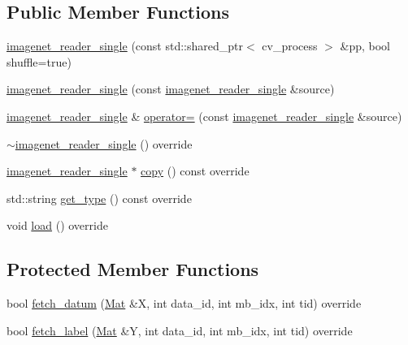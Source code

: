 \subsection*{Public Member Functions}
\begin{DoxyCompactItemize}
\item 
\hyperlink{classlbann_1_1imagenet__reader__single_ac42ce78ac5d191d571443dfea1f9d2ec}{imagenet\+\_\+reader\+\_\+single} (const std\+::shared\+\_\+ptr$<$ cv\+\_\+process $>$ \&pp, bool shuffle=true)
\item 
\hyperlink{classlbann_1_1imagenet__reader__single_abf3174dec9942137107faf6ef4d24e37}{imagenet\+\_\+reader\+\_\+single} (const \hyperlink{classlbann_1_1imagenet__reader__single}{imagenet\+\_\+reader\+\_\+single} \&source)
\item 
\hyperlink{classlbann_1_1imagenet__reader__single}{imagenet\+\_\+reader\+\_\+single} \& \hyperlink{classlbann_1_1imagenet__reader__single_af38327f44f1de2dd191cd2d1dc193900}{operator=} (const \hyperlink{classlbann_1_1imagenet__reader__single}{imagenet\+\_\+reader\+\_\+single} \&source)
\item 
\hyperlink{classlbann_1_1imagenet__reader__single_a6849f7af5ad0197f077f60c86a3c6c26}{$\sim$imagenet\+\_\+reader\+\_\+single} () override
\item 
\hyperlink{classlbann_1_1imagenet__reader__single}{imagenet\+\_\+reader\+\_\+single} $\ast$ \hyperlink{classlbann_1_1imagenet__reader__single_ac19ea9ae8887d86ef616099c2d93d699}{copy} () const override
\item 
std\+::string \hyperlink{classlbann_1_1imagenet__reader__single_aecd9cec6777e4a7485daa5b0396afee0}{get\+\_\+type} () const override
\item 
void \hyperlink{classlbann_1_1imagenet__reader__single_a7ea768d9784b7a9532551d7402ee4f8e}{load} () override
\end{DoxyCompactItemize}
\subsection*{Protected Member Functions}
\begin{DoxyCompactItemize}
\item 
bool \hyperlink{classlbann_1_1imagenet__reader__single_a77c576d6085d4a8674322275dd9bd133}{fetch\+\_\+datum} (\hyperlink{base_8hpp_a68f11fdc31b62516cb310831bbe54d73}{Mat} \&X, int data\+\_\+id, int mb\+\_\+idx, int tid) override
\item 
bool \hyperlink{classlbann_1_1imagenet__reader__single_a17b2e9f767fe36097acbc4600ce4e480}{fetch\+\_\+label} (\hyperlink{base_8hpp_a68f11fdc31b62516cb310831bbe54d73}{Mat} \&Y, int data\+\_\+id, int mb\+\_\+idx, int tid) override
\end{DoxyCompactItemize}
